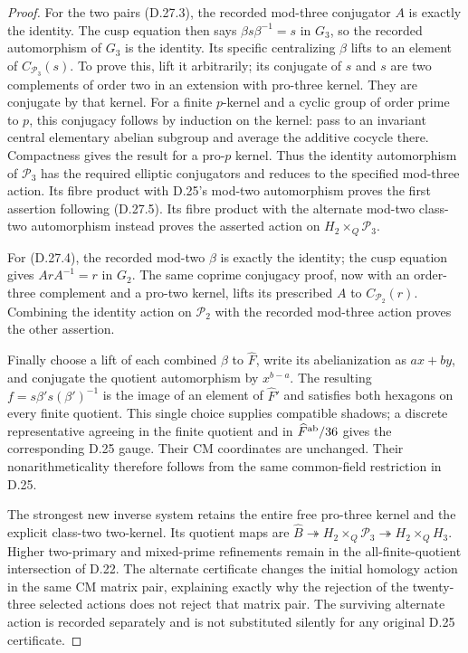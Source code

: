 \begin{proof}
For the two pairs (D.27.3), the recorded mod-three
conjugator $A$ is exactly the identity. The cusp equation
then says $\beta s\beta^{-1}=s$ in $G_3$, so the recorded
automorphism of $G_3$ is the identity. Its specific
centralizing $\beta$ lifts to an element of
$C_{\mathcal P_3}(s)$. To prove this, lift it arbitrarily;
its conjugate of $s$ and $s$ are two complements of order
two in an extension with pro-three kernel. They are
conjugate by that kernel. For a finite $p$-kernel and a
cyclic group of order prime to $p$, this conjugacy follows
by induction on the kernel: pass to an invariant central
elementary abelian subgroup and average the additive
cocycle there. Compactness gives the result for a
pro-$p$ kernel. Thus the identity automorphism of
$\mathcal P_3$ has the required elliptic conjugators and
reduces to the specified mod-three action.
Its fibre product with D.25's mod-two automorphism proves
the first assertion following (D.27.5).
Its fibre product with the alternate mod-two class-two
automorphism instead proves the asserted action on
$H_2\times_Q\mathcal P_3$.

For (D.27.4), the recorded mod-two $\beta$ is exactly the
identity; the cusp equation gives $ArA^{-1}=r$ in $G_2$.
The same coprime conjugacy proof, now with an order-three
complement and a pro-two kernel, lifts its prescribed $A$
to $C_{\mathcal P_2}(r)$. Combining the identity action on
$\mathcal P_2$ with the recorded mod-three action proves
the other assertion.

Finally choose a lift of each combined $\beta$ to
$\widehat F$, write its abelianization as $ax+by$, and
conjugate the quotient automorphism by $x^{b-a}$.
The resulting $f=s\beta's(\beta')^{-1}$ is the image of
an element of $\widehat F'$ and satisfies both hexagons
on every finite quotient. This single choice supplies
compatible shadows; a discrete representative agreeing
in the finite quotient and in $\widehat F^{\rm ab}/36$
gives the corresponding D.25 gauge. Their CM coordinates
are unchanged. Their nonarithmeticality therefore follows
from the same common-field restriction in D.25.

The strongest new inverse system retains the entire
free pro-three kernel and the explicit class-two
two-kernel. Its quotient maps are
$\widehat B\twoheadrightarrow H_2\times_Q\mathcal P_3
\twoheadrightarrow H_2\times_QH_3$.
Higher two-primary and mixed-prime refinements remain
in the all-finite-quotient intersection of D.22.
The alternate certificate changes the initial homology
action in the same CM matrix pair, explaining exactly
why the rejection of the twenty-three selected actions
does not reject that matrix pair. The surviving alternate
action is recorded separately and is not substituted
silently for any original D.25 certificate.
\end{proof}
